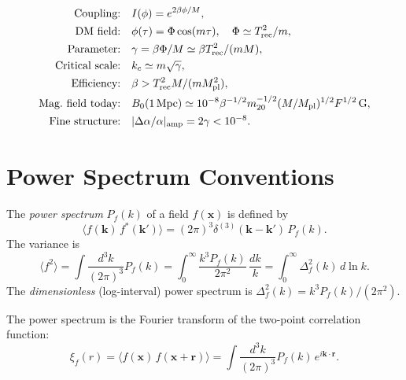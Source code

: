 \documentclass[12pt,a4paper,openany]{book}
\newcommand{\Mpl}{M_{\rm pl}}
\newcommand{\kc}{k_c}
\begin{document}
\begin{align}
  \text{Coupling:} &\quad I(\phi) = e^{2\beta\phi/M}, \\
  \text{DM field:} &\quad \phi(\tau) = \Phi\cos(m\tau), \quad \Phi \simeq T_{\rm rec}^2/m, \\
  \text{Parameter:} &\quad \gamma = \beta\Phi/M \simeq \beta T_{\rm rec}^2/(mM), \\
  \text{Critical scale:} &\quad \kc \simeq m\sqrt{\gamma}, \\
  \text{Efficiency:} &\quad \beta > T_{\rm rec}^2 M/(m\Mpl^2), \\
  \text{Mag.\ field today:} &\quad B_0(1\,\mathrm{Mpc}) \simeq 10^{-8}\beta^{-1/2}m_{20}^{-1/2}(M/\Mpl)^{1/2}F^{1/2}\,\mathrm{G}, \\
  \text{Fine structure:} &\quad |\Delta\alpha/\alpha|_{\rm amp} = 2\gamma < 10^{-8}.
\end{align}

\chapter{Power Spectrum Conventions}

The \emph{power spectrum} $P_f(k)$ of a field $f(\mathbf{x})$ is defined by
\begin{equation}
  \langle f(\mathbf{k})\,f^*(\mathbf{k}')\rangle = (2\pi)^3\delta^{(3)}(\mathbf{k}-\mathbf{k}')\,P_f(k).
\end{equation}
The variance is
\begin{equation}
  \langle f^2\rangle = \int\frac{d^3k}{(2\pi)^3}P_f(k) = \int_0^\infty \frac{k^3P_f(k)}{2\pi^2}\,\frac{dk}{k} = \int_0^\infty\Delta_f^2(k)\,d\ln k.
\end{equation}
The \emph{dimensionless} (log-interval) power spectrum is $\Delta_f^2(k) = k^3P_f(k)/(2\pi^2)$.

The power spectrum is the Fourier transform of the two-point correlation function:
\begin{equation}
  \xi_f(r) = \langle f(\mathbf{x})\,f(\mathbf{x}+\mathbf{r})\rangle = \int\frac{d^3k}{(2\pi)^3}P_f(k)\,e^{i\mathbf{k}\cdot\mathbf{r}}.
\end{equation}

\end{document}

